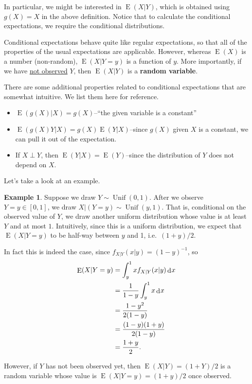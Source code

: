 \documentclass[
]{book}
\DeclareMathOperator{\E}{E}
\DeclareMathOperator{\Unif}{Unif}
\DeclareMathOperator{\dd}{d}
\newcommand{\dint}{\dd\hspace{0.5pt}\!}
\theoremstyle{definition}
\theoremstyle{definition}
\newtheorem{example}{Example}[chapter]
\theoremstyle{definition}
\theoremstyle{definition}
\theoremstyle{remark}
\begin{document}
In particular, we might be interested in \(\E(X|Y)\), which is obtained using \(g(X)=X\) in the above definition.
Notice that to calculate the conditional expectations, we require the conditional distributions.

Conditional expectations behave quite like regular expectations, so that all of the properties of the usual expectations are applicable.
However, whereas \(\E(X)\) is a number (non-random), \(\E(X|Y=y)\) is a function of \(y\).
More importantly, if we have \uline{not observed} \(Y\), then \(\E(X|Y)\) is a \textbf{random variable}.

There are some additional properties related to conditional expectations that are somewhat intuitive.
We list them here for reference.

\begin{itemize}
\item
  \(\E(g(X) | X) = g(X)\)--``the given variable is a constant''
\item
  \(\E(g(X) Y | X) = g(X) \E(Y|X)\)--since \(g(X)\) given \(X\) is a constant, we can pull it out of the expectation.
\item
  If \(X \perp Y\), then \(\E(Y|X)=\E(Y)\)--since the distribution of \(Y\) does not depend on \(X\).
\end{itemize}

Let's take a look at an example.

\begin{example}
Suppose we draw \(Y\sim\Unif(0,1)\).
After we observe \(Y=y\in[0,1]\), we draw \(X|(Y=y) \sim \Unif(y,1)\).
That is, conditional on the observed value of \(Y\), we draw another uniform distribution whose value is at least \(Y\) and at most \(1\).
Intuitively, since this is a uniform distribution, we expect that \(\E(X|Y=y)\) to be half-way between \(y\) and 1, i.e.~\((1+y)/2\).

In fact this is indeed the case, since \(f_{X|Y}(x|y) = (1-y)^{-1}\), so
\begin{align*}
\E(X|Y=y) 
&= \int_y^1 xf_{X|Y}(x|y) \dint x \\ 
&= \frac{1}{1-y} \int_y^1  x \dint x  \\
&=\frac{1-y^2}{2(1-y)} \\
&= \frac{(1-y)(1+y)}{2(1-y)} \\
&=\frac{1+y}{2}.
\end{align*}

However, if \(Y\) has not been observed yet, then \(\E(X|Y)=(1+Y)/2\) is a random variable whose value is \(\E(X|Y=y)=(1+y)/2\) once observed.
\end{example}
\end{document}
